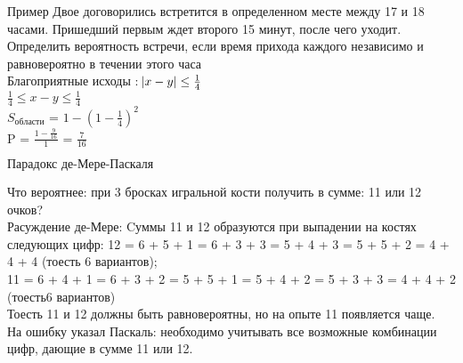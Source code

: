 \documentclass[russian, 12pt]{article}
\begin{document}
$\textbf{Пример}$ Двое договорились встретится в определенном месте между 17 и 18 часами. Пришедший первым ждет второго 15 минут, после чего уходит. Определить вероятность встречи, если время прихода каждого независимо и равновероятно в течении этого часа\\
Благоприятные исходы : $\abs{x - y} \leq \frac{1}{4}$\\
$\frac{1}{4} \leq x - y \leq \frac{1}{4}$\\	
$S_{области}$ = $1 - {(1 - \frac{1}{4})}^2$\\
P = $\frac{1 - \frac{9}{16}}{1}$ = $\frac{7}{16}$
\begin{center}
$\textbf{Парадокс де-Мере-Паскаля }$
\end{center}
Что вероятнее: при 3 бросках игральной кости получить в сумме: 11 или 12 очков?\\
Расуждение де-Мере: Cуммы 11 и 12 образуются при выпадении на костях следующих цифр: 12 =  6 +  5 + 1 = 6 + 3 + 3 = 5 + 4 + 3 = 5 + 5 + 2 = 4 + 4 + 4 (тоесть 6 вариантов);\\
11 =  6 + 4 + 1 = 6 + 3 + 2 = 5 + 5 + 1 = 5 + 4 + 2 = 5 + 3 + 3 = 4 + 4 + 2 (тоесть6 вариантов)\\
Тоесть 11 и 12 должны быть равновероятны, но на опыте 11 появляется чаще.\\
На ошибку указал Паскаль: необходимо учитывать все возможные комбинации цифр, дающие в сумме 11 или 12.
\end{document}
